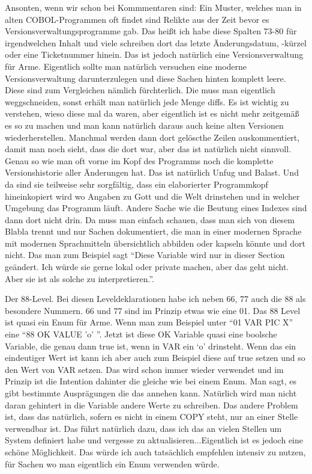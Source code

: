 {Ansonten, wenn wir schon bei Kommmentaren sind: Ein Muster, welches man in alten COBOL-Programmen oft findet sind Relikte aus der Zeit bevor es Versionsverwaltungsprogramme gab. Das heißt ich habe diese Spalten 73-80 für irgendwelchen Inhalt und viele schreiben dort das letzte Änderungsdatum, -kürzel oder \zB eine Ticketnummer hinein. Das ist jedoch natürlich eine Versionsverwaltung für Arme. Eigentlich sollte man natürlich versuchen eine moderne Versionsverwaltung darunterzulegen und diese Sachen hinten komplett leere. Diese sind zum Vergleichen nämlich fürchterlich. Die muss man eigentlich weggschneiden, sonst erhält man natürlich jede Menge diffs. Es ist wichtig zu verstehen, wieso diese mal da waren, aber eigentlich ist es nicht mehr zeitgemäß es so zu machen und man kann natürlich daraus auch keine alten Versionen wiederherstellen. Manchmal werden dann dort gelöscthe Zeilen auskommentiert, damit man noch sieht, dass die dort war, aber das ist natürlich nicht sinnvoll. Genau so wie man oft vorne im Kopf des Programms noch die komplette Versionshistorie aller Änderungen hat. Das ist natürlich Unfug und Balast. Und da sind sie teilweise sehr sorgfältig, dass ein elaborierter Programmkopf hineinkopiert wird wo Angaben zu Gott und die Welt drinstehen und in welcher Umgebung das Programm läuft. Andere Sache wie die Beutung eines Indexes sind dann dort nicht drin. Da muss man einfach schauen, dass man sich von diesem Blabla trennt und nur Sachen dokumentiert, die man in einer modernen Sprache mit modernen Sprachmitteln übersichtlich abbilden oder kapseln könnte und dort nicht. Das man zum Beispiel sagt ``Diese Variable wird nur in dieser Section geändert. Ich würde sie gerne lokal oder private machen, aber das geht nicht. Aber sie ist als solche zu interpretieren.''.

Der 88-Level. Bei diesen Leveldeklarationen habe ich neben 66, 77 auch die 88 als besondere Nummern. 66 und 77 sind im Prinzip etwas wie eine 01. Das 88 Level ist quasi ein Enum für Arme. Wenn man zum Beispiel unter ``01 VAR PIC X'' eine ``88 OK VALUE 'o' ''. Jetzt ist diese OK Variable quasi eine boolsche Variable, die genau dann true ist, wenn in VAR ein `o' drinsteht. Wenn das ein eindeutiger Wert ist kann ich aber auch zum Beispiel diese auf true setzen und so den Wert von VAR setzen. Das wird schon immer wieder verwendet und im Prinzip ist die Intention dahinter die gleiche wie bei einem Enum. Man sagt, es gibt bestimmte Ausprägungen die das annehen kann. Natürlich wird man nicht daran gehintert in die Variable andere Werte zu schreiben. Das andere Problem ist, dass das natürlich, sofern es nicht in einem COPY steht, nur an einer Stelle verwendbar ist. Das führt natürlich dazu, dass ich das an vielen Stellen um System definiert habe und vergesse zu aktualisieren...Eigentlich ist es jedoch eine schöne Möglichkeit. Das würde ich auch tatsächlich empfehlen intensiv zu nutzen, für Sachen wo man eigentlich ein Enum verwenden würde. }  
